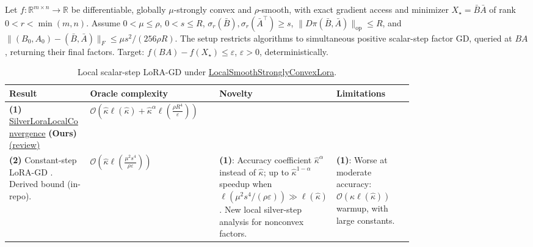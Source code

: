 \begin{table}[tp]
\centering
\caption{Local scalar-step LoRA-GD under \href{https://github.com/k3nfalt/longtails/blob/main/LongTails/Setups/LocalSmoothStronglyConvexLora.lean}{LocalSmoothStronglyConvexLora}.}\label{tab:LocalSmoothStronglyConvexLora}
\parbox{\linewidth}{\footnotesize Let $f:\mathbb R^{m\times n}\to\mathbb R$ be differentiable, globally $\mu$-strongly convex and $\rho$-smooth, with exact gradient access and minimizer $X_\star=\bar B\bar A$ of rank $0<r<\min(m,n)$. Assume $0<\mu\le\rho$, $0<s\le R$, $\sigma_r(\bar B),\sigma_r(\bar A^\top)\ge s$, $\|D\pi(\bar B,\bar A)\|_{\mathrm{op}}\le R$, and $\|(B_0,A_0)-(\bar B,\bar A)\|_F\le\mu s^2/(256\rho R)$. The setup restricts algorithms to simultaneous positive scalar-step factor GD, queried at $BA$, returning their final factors. Target: $f(BA)-f(X_\star)\le\varepsilon$, $\varepsilon>0$, deterministically.}\par\smallskip
\begin{threeparttable}
\footnotesize
\setlength{\tabcolsep}{4pt}\renewcommand{\arraystretch}{1.25}
\begin{tabularx}{\linewidth}{@{}>{\raggedright\arraybackslash}p{0.20\linewidth}>{\raggedright\arraybackslash}p{0.32\linewidth}>{\raggedright\arraybackslash}p{0.25\linewidth}>{\raggedright\arraybackslash}X@{}}
\toprule
\textbf{Result} & \textbf{Oracle complexity} & \textbf{Novelty} & \textbf{Limitations} \\
\midrule
\textbf{(1)} \href{https://github.com/k3nfalt/longtails/blob/main/LongTails/Theorems/SilverLoraLocalConvergence.lean}{Silver\allowbreak Lora\allowbreak Local\allowbreak Convergence} \textbf{(Ours)} \href{https://github.com/k3nfalt/longtails/blob/main/scripts/reviews/SilverLoraLocalConvergence.md}{(review)}
& $\mathcal{O}\!\left(\widehat\kappa\ell(\widehat\kappa)+\widehat\kappa^\alpha\ell\!\left(\frac{\rho R^4}{\varepsilon}\right)\right)$ & & \\
\midrule[1.2pt]
\textbf{(2)} Constant-step LoRA-GD \citep{slLoraWarmupSource}. Derived bound (in-repo).
& $\mathcal{O}\!\left(\widehat\kappa\ell\!\left(\frac{\mu^2s^4}{\rho\varepsilon}\right)\right)$
& \textbf{(1)}: Accuracy coefficient $\widehat\kappa^\alpha$ instead of $\widehat\kappa$; up to $\widehat\kappa^{1-\alpha}$ speedup when $\ell(\mu^2s^4/(\rho\varepsilon))\gg\ell(\widehat\kappa)$. New local silver-step analysis for nonconvex factors.
& \textbf{(1)}: Worse at moderate accuracy: $\mathcal{O}(\widehat\kappa\ell(\widehat\kappa))$ warmup, with large constants. \\

\end{tabularx}
\end{threeparttable}
\end{table}
